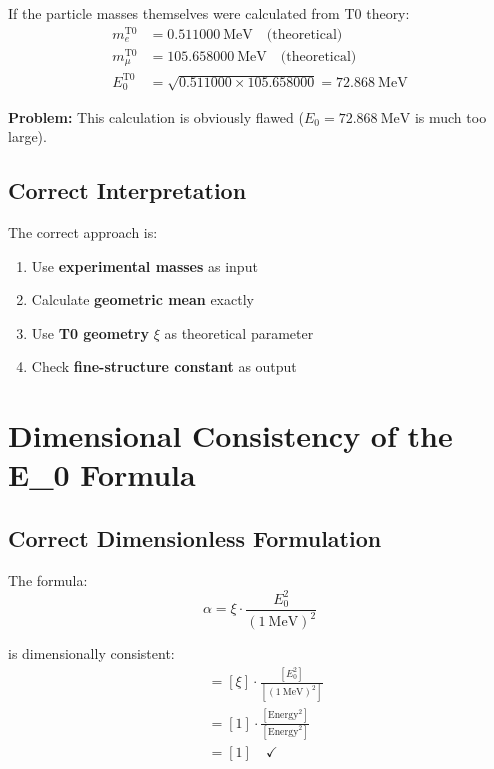 	If the particle masses themselves were calculated from T0 theory:
	\begin{align}
		m_e^{\text{T0}} &= \SI{0.511000}{\MeV} \quad \text{(theoretical)} \\
		m_\mu^{\text{T0}} &= \SI{105.658000}{\MeV} \quad \text{(theoretical)} \\
		E_0^{\text{T0}} &= \sqrt{0.511000 \times 105.658000} = \SI{72.868}{\MeV}
	\end{align}
	
	\textbf{Problem:} This calculation is obviously flawed ($E_0 = \SI{72.868}{\MeV}$ is much too large).
	
	\subsection{Correct Interpretation}
	
	The correct approach is:
	\begin{enumerate}
		\item Use \textbf{experimental masses} as input
		\item Calculate \textbf{geometric mean} exactly  
		\item Use \textbf{T0 geometry} $\xi$ as theoretical parameter
		\item Check \textbf{fine-structure constant} as output
	\end{enumerate}
	
	\section{Dimensional Consistency of the E\_0 Formula}
	
	\subsection{Correct Dimensionless Formulation}
	
	The formula:
	\begin{equation}
		\alpha = \xi \cdot \frac{E_0^2}{( \SI{1}{\MeV} )^2}
	\end{equation}
	
	is dimensionally consistent:
	\begin{align}
		[\alpha] &= [\xi] \cdot \frac{[E_0^2]}{[( \SI{1}{\MeV} )^2]} \\
		&= [1] \cdot \frac{[\text{Energy}^2]}{[\text{Energy}^2]} \\
		&= [1] \quad \checkmark
	\end{align}
	
